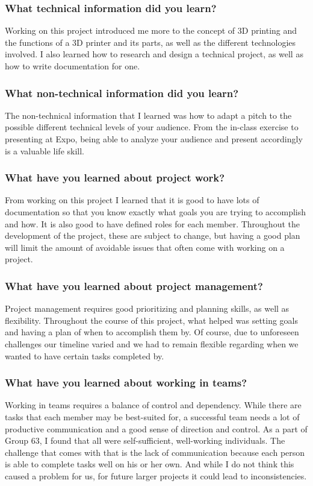 \subsubsection{What technical information did you learn?}
Working on this project introduced me more to the concept of 3D printing and the functions of a 3D printer and its parts, as well as the different technologies involved.
I also learned how to research and design a technical project, as well as how to write documentation for one.
\subsubsection{What non-technical information did you learn?}
The non-technical information that I learned was how to adapt a pitch to the possible different technical levels of your audience.
From the in-class exercise to presenting at Expo, being able to analyze your audience and present accordingly is a valuable life skill.
\subsubsection{What have you learned about project work?}
From working on this project I learned that it is good to have lots of documentation so that you know exactly what goals you are trying to accomplish and how.
It is also good to have defined roles for each member.
Throughout the development of the project, these are subject to change, but having a good plan will limit the amount of avoidable issues that often come with working on a project.
\subsubsection{What have you learned about project management?}
Project management requires good prioritizing and planning skills, as well as flexibility.
Throughout the course of this project, what helped was setting goals and having a plan of when to accomplish them by.
Of course, due to unforeseen challenges our timeline varied and we had to remain flexible regarding when we wanted to have certain tasks completed by.
\subsubsection{What have you learned about working in teams?}
Working in teams requires a balance of control and dependency. 
While there are tasks that each member may be best-suited for, a successful team needs a lot of productive communication and a good sense of direction and control.
As a part of Group 63, I found that all were self-sufficient, well-working individuals.
The challenge that comes with that is the lack of communication because each person is able to complete tasks well on his or her own.
And while I do not think this caused a problem for us, for future larger projects it could lead to inconsistencies.
